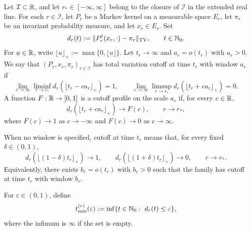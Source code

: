 \documentclass[11pt,reqno,a4paper]{article}
\newcommand{\TV}{\mathrm{TV}}
\begin{document}
\begin{definition}\label{def:intro-cutoff}
  Let $\mathcal I\subset\mathbb{R}$, and let $r_\ast\in[-\infty,\infty]$ belong to the
  closure of $\mathcal I$ in the extended real line. For each $r\in\mathcal I$, let $P_r$ be a
  Markov kernel on a measurable space $E_r$, let $\pi_r$ be an invariant
  probability measure, and let $x_r\in E_r$. Set
  \begin{equation}\label{eq:intro-tv-distance}
    d_r(t)
    :=
    \norm{P_r^t(x_r,\cdot)-\pi_r}_{\TV},
    \qquad
    t\in\N_0 .
  \end{equation}
  For $u\in\mathbb{R}$, write
  $\lfloor u\rfloor_+:=\max\{0,\lfloor u\rfloor\}$.
  Let $t_r\to\infty$ and $a_r=o(t_r)$ with $a_r>0$. We say that
  $(P_r,x_r,\pi_r)_{r\in\mathcal I}$ has total variation cutoff at time $t_r$
  with window $a_r$ if
  \begin{equation}\label{eq:intro-cutoff-convention}
    \lim_{c\to\infty}\liminf_{r\to r_\ast}
    d_r\left(\lfloor t_r-ca_r\rfloor_+\right)
    =
    1,
    \qquad
    \lim_{c\to\infty}\limsup_{r\to r_\ast}
    d_r\left(\lfloor t_r+ca_r\rfloor_+\right)
    =
    0.
  \end{equation}
  A function $F:\mathbb{R}\to[0,1]$ is a cutoff profile on the scale $a_r$ if, for
  every $c\in\mathbb{R}$,
  \begin{equation}\label{eq:intro-cutoff-profile}
    d_r\left(\lfloor t_r+ca_r\rfloor_+\right)
    \to
    F(c),
    \qquad
    r\to r_\ast,
  \end{equation}
  where $F(c)\to1$ as $c\to-\infty$ and $F(c)\to0$ as $c\to\infty$.

  When no window is specified, cutoff at time $t_r$ means that, for every
  fixed $\delta\in(0,1)$,
  \begin{equation}\label{eq:intro-cutoff-window-free}
    d_r\left(\lfloor(1-\delta)t_r\rfloor_+\right)\to1,
    \qquad
    d_r\left(\lfloor(1+\delta)t_r\rfloor_+\right)\to0,
    \qquad
    r\to r_\ast.
  \end{equation}
  Equivalently, there exists $b_r=o(t_r)$ with $b_r>0$ such that the family
  has cutoff at time $t_r$ with window $b_r$.
\end{definition}

\begin{definition}\label{def:intro-mixing-time}
  For $\varepsilon\in(0,1)$, define
  \begin{equation}\label{eq:intro-mixing-time}
    t_{\mathrm{mix}}^{(r)}(\varepsilon)
    :=
    \inf\{t\in\mathbb{N}_0:\ d_r(t)\leq\varepsilon\},
  \end{equation}
  where the infimum is $\infty$ if the set is empty.
\end{definition}
\end{document}
